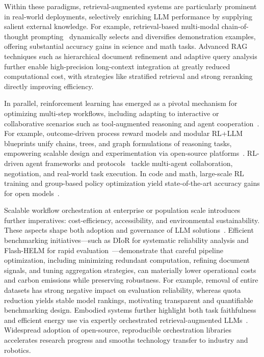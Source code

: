 \documentclass[sigconf]{acmart}
\begin{document}
Within these paradigms, retrieval-augmented systems are particularly prominent in real-world deployments, selectively enriching LLM performance by supplying salient external knowledge. For example, retrieval-based multi-modal chain-of-thought prompting~\cite{ref5} dynamically selects and diversifies demonstration examples, offering substantial accuracy gains in science and math tasks. Advanced RAG techniques such as hierarchical document refinement and adaptive query analysis~\cite{ref80} further enable high-precision long-context integration at greatly reduced computational cost, with strategies like stratified retrieval and strong reranking directly improving efficiency.

In parallel, reinforcement learning has emerged as a pivotal mechanism for optimizing multi-step workflows, including adapting to interactive or collaborative scenarios such as tool-augmented reasoning and agent cooperation~\cite{ref8,ref9,ref12,ref37,ref55,ref57,ref60,ref64,ref86}. For example, outcome-driven process reward models and modular RL+LLM blueprints unify chains, trees, and graph formulations of reasoning tasks, empowering scalable design and experimentation via open-source platforms~\cite{ref12}. RL-driven agent frameworks and protocols~\cite{ref55,ref60} tackle multi-agent collaboration, negotiation, and real-world task execution. In code and math, large-scale RL training and group-based policy optimization yield state-of-the-art accuracy gains for open models~\cite{ref57}.

Scalable workflow orchestration at enterprise or population scale introduces further imperatives: cost-efficiency, accessibility, and environmental sustainability. These aspects shape both adoption and governance of LLM solutions~\cite{ref37,ref43,ref55,ref88,ref104}. Efficient benchmarking initiatives—such as DIoR for systematic reliability analysis and Flash-HELM for rapid evaluation~\cite{ref104}—demonstrate that careful pipeline optimization, including minimizing redundant computation, refining document signals, and tuning aggregation strategies, can materially lower operational costs and carbon emissions while preserving robustness. For example, removal of entire datasets has strong negative impact on evaluation reliability, whereas quota reduction yields stable model rankings, motivating transparent and quantifiable benchmarking design. Embodied systems further highlight both task faithfulness and efficient energy use via expertly orchestrated retrieval-augmented LLMs~\cite{ref37}. Widespread adoption of open-source, reproducible orchestration libraries~\cite{ref12,ref43,ref64,ref79,ref86} accelerates research progress and smooths technology transfer to industry and robotics.
\end{document}
